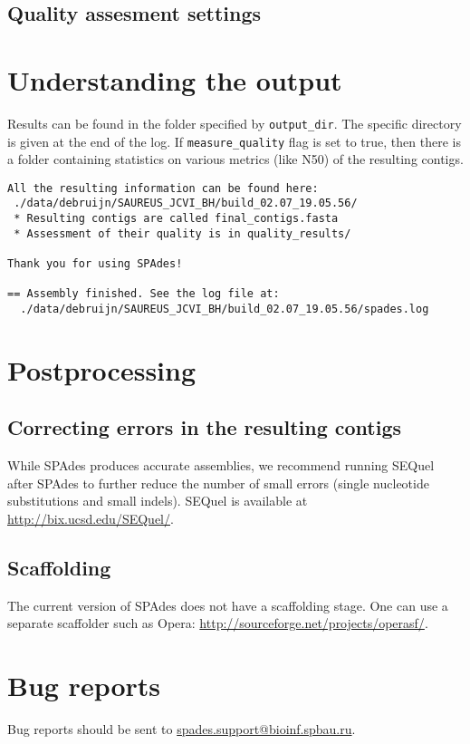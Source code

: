 \documentclass{article}
\def\spades{SPAdes}
\begin{document}
\subsection{Quality assesment settings}


\section{Understanding the output}
Results can be found in the folder specified by {\tt output\_dir}.
The specific directory is given at the end of the log.
If {\tt measure\_quality} flag is set to true, then 
there is a folder containing statistics on various metrics (like N50) of the resulting contigs.
\begin{lstlisting}
All the resulting information can be found here: 
 ./data/debruijn/SAUREUS_JCVI_BH/build_02.07_19.05.56/
 * Resulting contigs are called final_contigs.fasta
 * Assessment of their quality is in quality_results/

Thank you for using SPAdes!

== Assembly finished. See the log file at: 
  ./data/debruijn/SAUREUS_JCVI_BH/build_02.07_19.05.56/spades.log
\end{lstlisting}

\section{Postprocessing}

\subsection{Correcting errors in the resulting contigs}
While {\spades} produces accurate assemblies, 
we recommend running SEQuel~\cite{sequel} after {\spades} to further reduce the number of small errors (single nucleotide substitutions and small indels). SEQuel is available at
\url{http://bix.ucsd.edu/SEQuel/}.


\subsection{Scaffolding}
The current version of {\spades} does not have a scaffolding stage.
One can use a separate scaffolder such as Opera: \url{http://sourceforge.net/projects/operasf/}.

\section{Bug reports}
Bug reports should be sent to \url{spades.support@bioinf.spbau.ru}.




\end{document}
